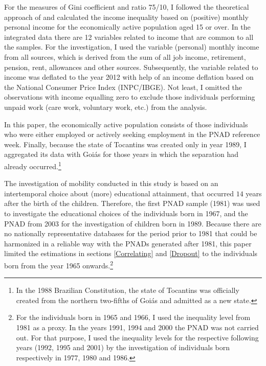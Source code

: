 \documentclass[a4paper, 12pt]{article}
\begin{document}
For the measures of Gini coefficient and ratio 75/10, I followed the theoretical approach of \citet{hoffmann2006queda} and calculated the income inequality based on (positive) monthly personal income for the economically active population aged 15 or over. In the integrated data there are 12 variables related to income that are common to all the samples. For the investigation, I used the variable (personal) monthly income from all sources, which is derived from the sum of all job income, retirement, pension, rent, allowances and other sources. Subsequently, the variable related to income was deflated to the year 2012 with help of an income deflation based on the National Consumer Price Index (INPC/IBGE). Not least, I omitted the observations with income equalling zero to exclude those individuals performing unpaid work (care work, voluntary work, etc.) from the analysis.

In this paper, the economically active population consists of those individuals who were either employed or actively seeking employment in the PNAD reference week. Finally, because the state of Tocantins was created only in year 1989, I aggregated its data with Goiás for those years in which the separation had already occurred.\footnote{In the 1988 Brazilian Constitution, the state of Tocantins was officially created from the northern two-fifths of Goiás and admitted as a new state.}


The investigation of mobility conducted in this study is based on an intertemporal choice about (more) educational attainment, that occurred $14$ years after the birth of the children. Therefore, the first PNAD sample (1981) was used to investigate the educational choices of the individuals born in 1967, and the PNAD from 2003 for the investigation of children born in 1989. Because there are no nationally representative databases for the period prior to 1981 that could be harmonized in a reliable way with the PNADs generated after 1981, this paper limited the estimations in sections \ref{Correlating} and \ref{Dropout} to the individuals born from the year 1965 onwards.\footnote{For the individuals born in 1965 and 1966, I used the inequality level from 1981 as a proxy. In the years 1991, 1994 and 2000 the PNAD was not carried out. For that purpose, I used the inequality levels for the respective following years (1992, 1995 and 2001) by the investigation of individuals born respectively in 1977, 1980 and 1986.}
\end{document}
